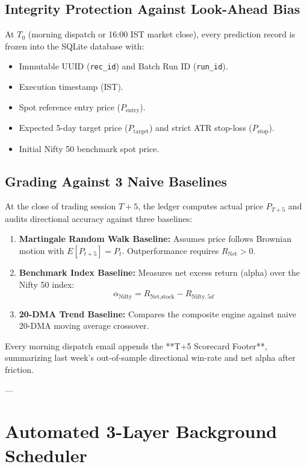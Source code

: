\documentclass[11pt,a4paper]{article}
\begin{document}
\subsection{Integrity Protection Against Look-Ahead Bias}
At $T_0$ (morning dispatch or 16:00 IST market close), every prediction record is frozen into the SQLite database with:
\begin{itemize}
    \item Immutable UUID (\texttt{rec\_id}) and Batch Run ID (\texttt{run\_id}).
    \item Execution timestamp (IST).
    \item Spot reference entry price ($P_{\text{entry}}$).
    \item Expected 5-day target price ($P_{\text{target}}$) and strict ATR stop-loss ($P_{\text{stop}}$).
    \item Initial Nifty 50 benchmark spot price.
\end{itemize}

\subsection{Grading Against 3 Naive Baselines}
At the close of trading session $T+5$, the ledger computes actual price $P_{T+5}$ and audits directional accuracy against three baselines:
\begin{enumerate}
    \item \textbf{Martingale Random Walk Baseline:} Assumes price follows Brownian motion with $E[P_{t+5}] = P_t$. Outperformance requires $R_{\text{Net}} > 0$.
    \item \textbf{Benchmark Index Baseline:} Measures net excess return (alpha) over the Nifty 50 index:
    \begin{equation}
    \alpha_{\text{Nifty}} = R_{\text{Net}, \text{stock}} - R_{\text{Nifty}, 5d}
    \end{equation}
    \item \textbf{20-DMA Trend Baseline:} Compares the composite engine against naive 20-DMA moving average crossover.
\end{enumerate}

Every morning dispatch email appends the **T+5 Scorecard Footer**, summarizing last week's out-of-sample directional win-rate and net alpha after friction.

---

\section{Automated 3-Layer Background Scheduler}
\end{document}

